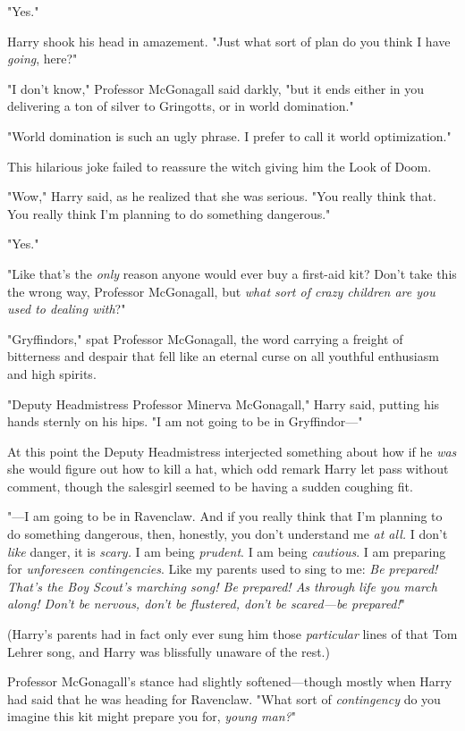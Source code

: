 "Yes."

Harry shook his head in amazement. "Just what sort of plan do you think I have
\emph{going}, here?"

"I don't know," Professor McGonagall said darkly, "but it ends either in you
delivering a ton of silver to Gringotts, or in world domination."

"World domination is such an ugly phrase. I prefer to call it world
optimization."

This hilarious joke failed to reassure the witch giving him the Look of Doom.

"Wow," Harry said, as he realized that she was serious. "You really think that.
You really think I'm planning to do something dangerous."

"Yes."

"Like that's the \emph{only} reason anyone would ever buy a first-aid kit?
Don't take this the wrong way, Professor McGonagall, but \emph{what sort of
crazy children are you used to dealing with}?"

"Gryffindors," spat Professor McGonagall, the word carrying a freight of
bitterness and despair that fell like an eternal curse on all youthful
enthusiasm and high spirits.

"Deputy Headmistress Professor Minerva McGonagall," Harry said, putting his
hands sternly on his hips. "I am not going to be in Gryffindor—"

At this point the Deputy Headmistress interjected something about how if he
\emph{was} she would figure out how to kill a hat, which odd remark Harry let
pass without comment, though the salesgirl seemed to be having a sudden
coughing fit.

"—I am going to be in Ravenclaw. And if you really think that I'm planning to
do something dangerous, then, honestly, you don't understand me \emph{at all.}
I don't \emph{like} danger, it is \emph{scary.} I am being \emph{prudent}. I am
being \emph{cautious}. I am preparing for \emph{unforeseen contingencies}. Like
my parents used to sing to me: \emph{Be prepared! That's the Boy Scout's
marching song! Be prepared! As through life you march along! Don't be nervous,
don't be flustered, don't be scared—be prepared!}"

(Harry's parents had in fact only ever sung him those \emph{particular} lines
of that Tom Lehrer song, and Harry was blissfully unaware of the rest.)

Professor McGonagall's stance had slightly softened—though mostly when Harry
had said that he was heading for Ravenclaw. "What sort of \emph{contingency} do
you imagine this kit might prepare you for, \emph{young man?}"

